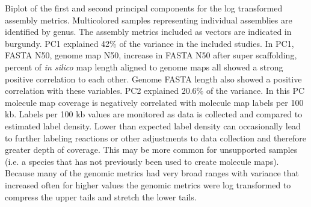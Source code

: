 Biplot of the first and second principal components for the log transformed assembly metrics. Multicolored samples representing individual assemblies are identified by genus. The assembly metrics included as vectors are indicated in burgundy.
PC1 explained 42\% of the variance in the included studies. In PC1, FASTA N50, genome map N50, increase in FASTA N50 after super scaffolding, percent of \textit{in silico} map length aligned to genome maps all showed a strong positive correlation to each other. Genome FASTA length also showed a positive correlation with these variables.
PC2 explained 20.6\% of the variance. In this PC molecule map coverage is negatively correlated with molecule map labels per 100 kb. Labels per 100 kb values are monitored as data is collected and compared to estimated label density. Lower than expected label density can occasionally lead to further labeling reactions or other adjustments to data collection and therefore greater depth of coverage. This may be more common for unsupported samples (i.e. a species that has not previously been used to create molecule maps).
Because many of the genomic metrics had very broad ranges with variance that increased often for higher values the genomic metrics were log transformed to compress the upper tails and stretch the lower tails.